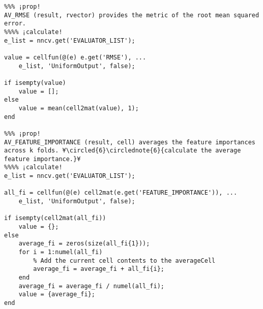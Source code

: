 \documentclass{tufte-handout}
\begin{document}
\begin{lstlisting}
%%% ¡prop!
AV_RMSE (result, rvector) provides the metric of the root mean squared error. 
%%%% ¡calculate!
e_list = nncv.get('EVALUATOR_LIST');

value = cellfun(@(e) e.get('RMSE'), ...
    e_list, 'UniformOutput', false);

if isempty(value)
    value = [];
else
    value = mean(cell2mat(value), 1);
end

%%% ¡prop!
AV_FEATURE_IMPORTANCE (result, cell) averages the feature importances across k folds. ¥\circled{6}\circlednote{6}{calculate the average feature importance.}¥
%%%% ¡calculate!
e_list = nncv.get('EVALUATOR_LIST');

all_fi = cellfun(@(e) cell2mat(e.get('FEATURE_IMPORTANCE')), ...
    e_list, 'UniformOutput', false);

if isempty(cell2mat(all_fi))
    value = {};
else
    average_fi = zeros(size(all_fi{1}));
    for i = 1:numel(all_fi)
        % Add the current cell contents to the averageCell
        average_fi = average_fi + all_fi{i};
    end
    average_fi = average_fi / numel(all_fi);
    value = {average_fi};
end
\end{lstlisting}

\clearpage
\end{document}
